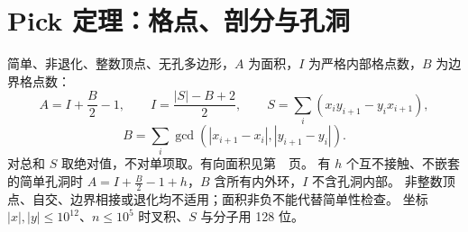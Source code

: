 \section{Pick 定理：格点、剖分与孔洞}\label{knowledge-pick}
简单、非退化、整数顶点、无孔多边形，$A$ 为面积，$I$ 为严格内部格点数，$B$ 为边界格点数：
\[
A=I+\frac B2-1,\qquad I=\frac{|S|-B+2}{2},\qquad
S=\sum_i(x_i y_{i+1}-y_i x_{i+1}),
\]
\[
B=\sum_i\gcd(|x_{i+1}-x_i|,|y_{i+1}-y_i|).
\]
对总和 $S$ 取绝对值，不对单项取。有向面积见第~\pageref{compact-polygon_area2}~页。
有 $h$ 个互不接触、不嵌套的简单孔洞时 $A=I+\frac B2-1+h$，$B$ 含所有内外环，$I$ 不含孔洞内部。
非整数顶点、自交、边界相接或退化均不适用；面积非负不能代替简单性检查。
坐标 $|x|,|y|\le10^{12}$、$n\le10^5$ 时叉积、$S$ 与分子用 128 位。
